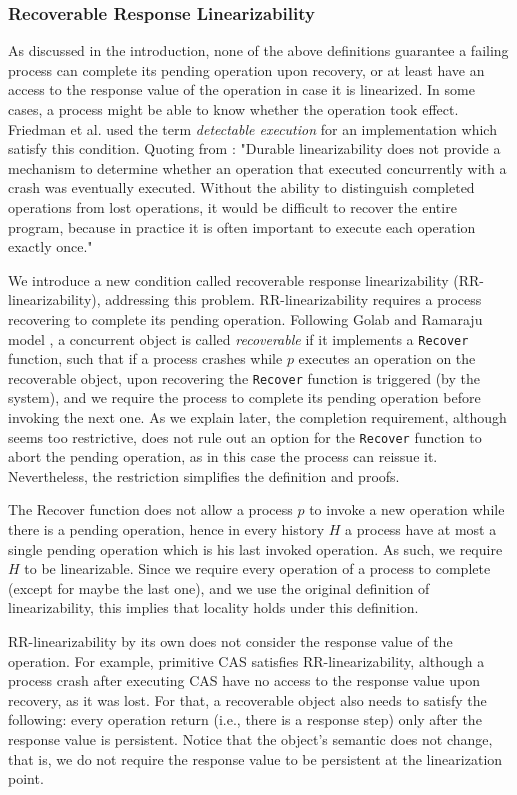 \subsubsection{Recoverable Response Linearizability}
As discussed in the introduction, none of the above definitions guarantee a failing process can complete its pending operation upon recovery, or at least have an access to the response value of the operation in case it is linearized. In some cases, a process might be able to know whether the operation took effect. Friedman et al. \cite{DBLP:conf/wdag/FriedmanHMP17} used the term \textit{detectable execution} for an implementation which satisfy this condition. Quoting from \cite{DBLP:conf/wdag/FriedmanHMP17}: "Durable linearizability does not provide a mechanism to determine whether an operation that executed concurrently with a crash was eventually executed. Without the ability to distinguish completed operations from lost operations, it would be difficult to recover the entire program, because in practice it is often important to execute each operation exactly once."

We introduce a new condition called recoverable response linearizability (RR-linearizability), addressing this problem. RR-linearizability requires a process recovering to complete its pending operation. Following Golab and Ramaraju model \cite{gr:rme}, a concurrent object is called \textit{recoverable} if it implements a \texttt{Recover} function, such that if a process crashes while $p$ executes an operation on the recoverable object, upon recovering the \texttt{Recover} function is triggered (by the system), and we require the process to complete its pending operation before invoking the next one. As we explain later, the completion requirement, although seems too restrictive, does not rule out an option for the \texttt{Recover} function to abort the pending operation, as in this case the process can reissue it. Nevertheless, the restriction simplifies the definition and proofs.

The Recover function does not allow a process $p$ to invoke a new operation while there is a pending operation, hence in every history $H$ a process have at most a single pending operation which is his last invoked operation. As such, we require $H$ to be linearizable. Since we require every operation of a process to complete (except for maybe the last one), and we use the original definition of linearizability, this implies that locality holds under this definition.

RR-linearizability by its own does not consider the response value of the operation. For example, primitive CAS satisfies RR-linearizability, although a process crash after executing CAS have no access to the response value upon recovery, as it was lost. For that, a recoverable object also needs to satisfy the following: every operation return (i.e., there is a response step) only after the response value is persistent. Notice that the object's semantic does not change, that is, we do not require the response value to be persistent at the linearization point.

